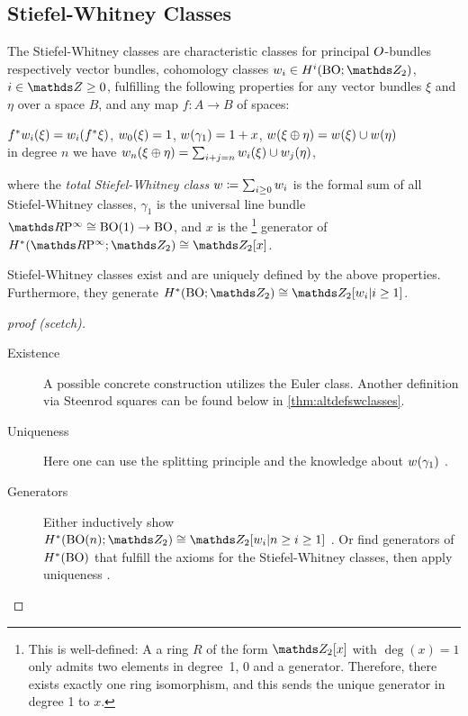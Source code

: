 \subsection{Stiefel-Whitney Classes}
\begin{Def}\label{def:swclasses}
  The Stiefel-Whitney classes are
  characteristic classes for principal $O$-bundles
  respectively vector bundles,
  \idest cohomology classes
  $\ws{i}\in \H^i(\BO;\Zmod2)$, $i\in\Z\geq0$,
  fulfilling the following properties for any vector bundles $\xi$ and
  $\eta$ over a space $B$, and any map $f\colon A\to B$ of spaces:
  \begin{axioms}
  \axiom[Naturality] ${f}^*{w_{i}}(\xi) = {w_{i}}({f}^* \xi)$,
  \axiom ${w_{0}}(\xi)=1$,
  \axiom ${w_{}}(\gamma_1) = 1 + x$,
  \axiom[Multiplicativity] ${w_{}}(\xi \oplus \eta) = {w_{}}(\xi)\cup {w_{}}(\eta)$
    \\\idest in degree $n$ we have
    ${w_{n}}(\xi\oplus\eta) = \sum_{i+j=n}{w_{i}}(\xi) \cup {w_{j}}(\eta)$,
  \end{axioms}
  where the \emph{total Stiefel-Whitney class}
  $w\coloneqq\sum_{i\geq 0}w_{i}$ is the formal sum of all
  Stiefel-Whitney classes,
  $\gamma_1$ is the universal line bundle $\RP\cong\BO(1)\to\BO$,
  and $x$ is the%
  \footnote{
    This is well-defined: A a ring $R$ of the form $\Zmod2[x]$
    with $\deg(x)=1$ only admits two elements in degree~1, $0$ and a
    generator. Therefore, there exists exactly one ring
    isomorphism, and this sends the unique generator in
    degree 1 to $x$.
  }
  generator of $\H^*(\RP;\Zmod2)\cong\Zmod2[x]$.
\end{Def}

\begin{Thm}
  Stiefel-Whitney classes exist and are uniquely defined by the above
  properties. Furthermore, they generate $\H^*(\BO;\Zmod2)\cong \Zmod2[\ws{i}|i\geq1]$.
  \begin{proof}[proof (scetch)]
    \begin{description}
    \item[Existence]
      A possible concrete construction utilizes the Euler
      class. Another definition via Steenrod squares can be 
      found below in \autoref{thm:altdefswclasses}.
    \item[Uniqueness]
      Here one can use the splitting principle and the knowledge about
      ${w_{}}(\gamma_1)$
      \cite[Uniqueness Theorem~7.3]{milnor}.
    \item[Generators]
      Either inductively show
      $\H^*(\BO(n);\Zmod2)\cong \Zmod2[\ws{i}|n\geq i\geq1]$
      \cite[Theorem~7.1~ff.]{milnor}.
      Or find generators of $H^*(\mathrm{BO})$ that fulfill the axioms for
      the Stiefel-Whitney classes, then apply uniqueness
      \cite[Chap.~7.6]{may}.
    \end{description}
  \end{proof}
\end{Thm}

